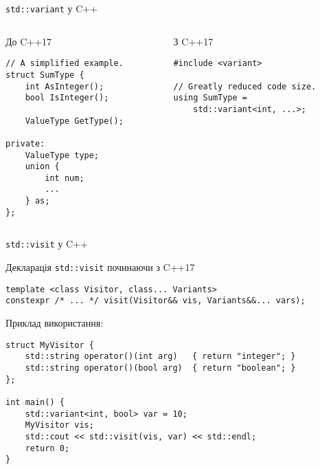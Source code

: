 \documentclass{beamer}
\begin{document}
	\begin{frame}[fragile]{\texttt{std::variant} у C++}

		\begin{columns}
			\begin{column}{0.45\textwidth}
\begin{block}{До C++17}
\begin{verbatim}
// A simplified example.
struct SumType {
	int AsInteger();
	bool IsInteger();
	
	ValueType GetType();
	
private:
	ValueType type;
	union {
		int num;
		...	
	} as;
};
\end{verbatim}
\end{block}
			\end{column}

			\begin{column}{0.5\textwidth}
\begin{block}{З C++17}
\begin{verbatim}
#include <variant>

// Greatly reduced code size.
using SumType =
	std::variant<int, ...>;
\end{verbatim}
\end{block}
			\end{column}
		\end{columns}
	\end{frame}
	
	\begin{frame}[fragile]{\texttt{std::visit} у C++}
		\begin{block}{Декларація \texttt{std::visit} починаючи з C++17}
\begin{verbatim}
template <class Visitor, class... Variants>
constexpr /* ... */ visit(Visitor&& vis, Variants&&... vars);
\end{verbatim}
		\end{block}

		\begin{center}
			Приклад використання:
		\end{center}
\begin{verbatim}
struct MyVisitor {
	std::string operator()(int arg)   { return "integer"; }
	std::string operator()(bool arg)  { return "boolean"; }
};

int main() {
	std::variant<int, bool> var = 10;
	MyVisitor vis;
	std::cout << std::visit(vis, var) << std::endl;
	return 0;
}
\end{verbatim}
	\end{frame}
\end{document}
